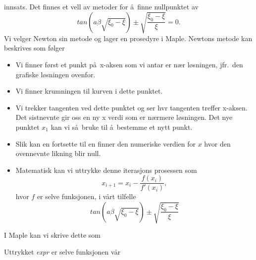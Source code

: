 \documentclass{article}
\begin{document}
innsats. Det finnes et vell av metoder for \aa\ finne nullpunktet
av 
\[
   tan(a\beta\sqrt{\xi_0-\xi})\pm\sqrt{\frac{\xi_0-\xi}{\xi}}=0.
\]
Vi velger Newton sin metode og lager en prosedyre i Maple.
Newtons metode kan beskrives som f\o lger
\begin{itemize}
\item Vi finner f\o rst et punkt p\aa\ x-aksen som vi antar 
er n\ae r l\o sningen, jfr.\ den grafiske l\o sningen ovenfor.
\item Vi finner krumningen til kurven i dette punktet.
\item Vi trekker tangenten ved dette punktet og ser hvr 
tangenten treffer x-aksen. Det sistnevnte gir oss en ny x verdi som
er n\ae rmere l\o sningen. Det nye punktet $x_1$ kan vi s\aa\ bruke
til \aa\ bestemme et nytt punkt.
\item Slik kan en fortsette til en finner den numeriske verdien
for $x$ hvor den ovennevnte likning blir null.
\item Matematisk kan vi uttrykke denne iterasjons prosessen som
     \[
        x_{i+1}=x_i-\frac{f(x_i)}{f'(x_i)},
     \]
hvor $f$ er selve funksjonen, i v\aa rt tilfelle
\[
   tan(a\beta\sqrt{\xi_0-\xi})\pm\sqrt{\frac{\xi_0-\xi}{\xi}}
\]
\end{itemize}
I Maple kan vi skrive dette som 
\begin{maplegroup}
\begin{mapleinput}
\end{mapleinput}

\begin{mapleinput}
\end{mapleinput}

\begin{mapleinput}
\end{mapleinput}

\begin{mapleinput}
\end{mapleinput}

\end{maplegroup}
Uttrykket {\it expr} er selve funksjonen v\aa r 
\begin{maplegroup}
\begin{mapleinput}
{%
}
\end{mapleinput}

\end{maplegroup}
\end{document}
